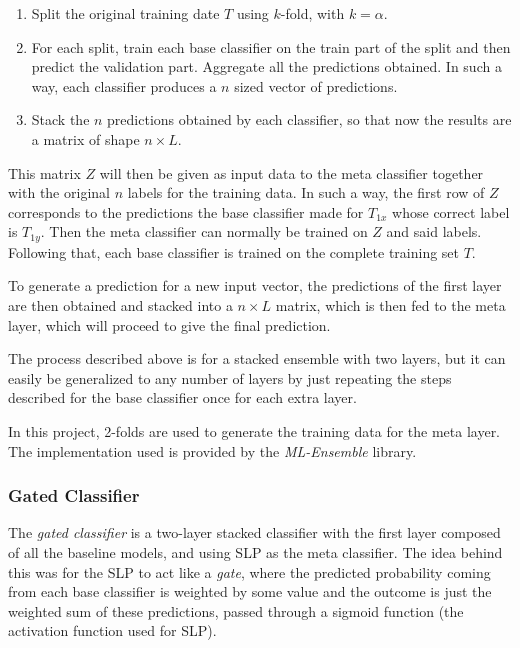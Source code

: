\documentclass[epsfig,a4paper,11pt,titlepage,twoside,openany]{book}
\begin{document}
\begin{enumerate}
    \item Split the original training date $T$ using $k$-fold, with $k = \alpha$.
    \item For each split, train each base classifier on the train part of the split and then predict the validation part. Aggregate all the predictions obtained. In such a way, each classifier produces a $n$ sized vector of predictions.
    \item Stack the $n$ predictions obtained by each classifier, so that now the results are a matrix of shape $n \times L$.
\end{enumerate}

This matrix $Z$ will then be given as input data to the meta classifier together with the original $n$ labels for the training data. In such a way, the first row of $Z$ corresponds to the predictions the base classifier made for $T_{1x}$ whose correct label is $T_{1y}$. Then the meta classifier can normally be trained on $Z$ and said labels. Following that, each base classifier is trained on the complete training set $T$.

To generate a prediction for a new input vector, the predictions of the first layer are then obtained and stacked into a $n \times L$ matrix, which is then fed to the meta layer, which will proceed to give the final prediction. 

The process described above is for a stacked ensemble with two layers, but it can easily be generalized to any number of layers by just repeating the steps described for the base classifier once for each extra layer. 

In this project, 2-folds are used to generate the training data for the meta layer. The implementation used is provided by the \textit{ML-Ensemble} \cite{flennerhag:2017mlens} library.



\subsubsection{Gated Classifier}
\label{sec:gated-classifier}

The \textit{gated classifier} is a two-layer stacked classifier with the first layer composed of all the baseline models, and using SLP as the meta classifier. The idea behind this was for the SLP to act like a \textit{gate}, where the predicted probability coming from each base classifier is weighted by some value and the outcome is just the weighted sum of these predictions, passed through a sigmoid function (the activation function used for SLP). 
\end{document}

